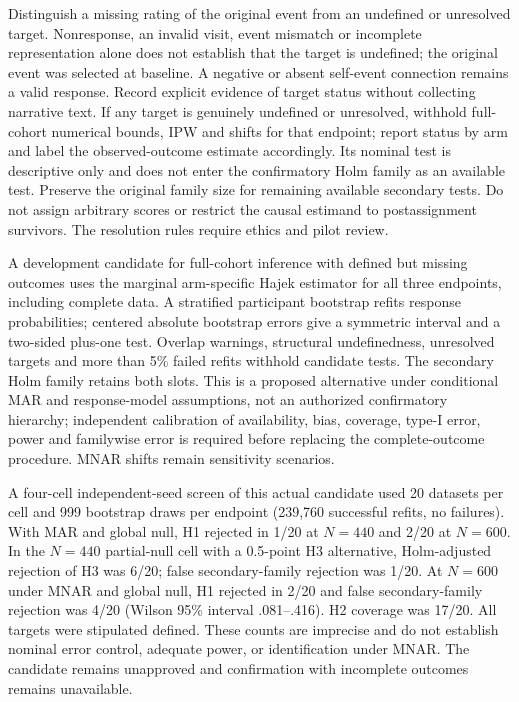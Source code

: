 \documentclass[11pt,a4paper]{article}
\begin{document}
\par Distinguish a missing rating of the original event from an undefined or unresolved target. Nonresponse, an invalid visit, event mismatch or incomplete representation alone does not establish that the target is undefined; the original event was selected at baseline. A negative or absent self-event connection remains a valid response. Record explicit evidence of target status without collecting narrative text. If any target is genuinely undefined or unresolved, withhold full-cohort numerical bounds, IPW and shifts for that endpoint; report status by arm and label the observed-outcome estimate accordingly. Its nominal test is descriptive only and does not enter the confirmatory Holm family as an available test. Preserve the original family size for remaining available secondary tests. Do not assign arbitrary scores or restrict the causal estimand to postassignment survivors. The resolution rules require ethics and pilot review.
\par A development candidate for full-cohort inference with defined but missing outcomes uses the marginal arm-specific Hajek estimator for all three endpoints, including complete data. A stratified participant bootstrap refits response probabilities; centered absolute bootstrap errors give a symmetric interval and a two-sided plus-one test. Overlap warnings, structural undefinedness, unresolved targets and more than 5\% failed refits withhold candidate tests. The secondary Holm family retains both slots. This is a proposed alternative under conditional MAR and response-model assumptions, not an authorized confirmatory hierarchy; independent calibration of availability, bias, coverage, type-I error, power and familywise error is required before replacing the complete-outcome procedure. MNAR shifts remain sensitivity scenarios.
\par A four-cell independent-seed screen of this actual candidate used 20 datasets per cell and 999 bootstrap draws per endpoint (239,760 successful refits, no failures). With MAR and global null, H1 rejected in 1/20 at $N=440$ and 2/20 at $N=600$. In the $N=440$ partial-null cell with a 0.5-point H3 alternative, Holm-adjusted rejection of H3 was 6/20; false secondary-family rejection was 1/20. At $N=600$ under MNAR and global null, H1 rejected in 2/20 and false secondary-family rejection was 4/20 (Wilson 95\% interval .081--.416). H2 coverage was 17/20. All targets were stipulated defined. These counts are imprecise and do not establish nominal error control, adequate power, or identification under MNAR. The candidate remains unapproved and confirmation with incomplete outcomes remains unavailable.
\end{document}
